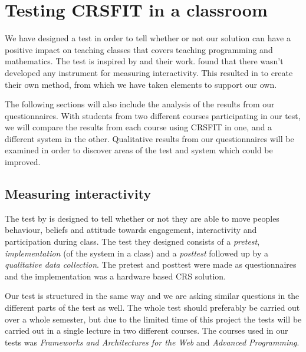 
\section{Testing CRSFIT in a classroom}\label{sec:testingcrs}
We have designed a test in order to tell whether or not our solution can have a positive impact on teaching classes that covers teaching programming and mathematics. The test is inspired by \cite{siau2006use} and their work.  found that there wasn't developed any instrument for measuring interactivity. This resulted in  to create their own method, from which we have taken elements to support our own.

The following sections will also include the analysis of the results from our questionnaires. With students from two different courses participating in our test, we will compare the results from each course using CRSFIT in one, and a different system in the other. Qualitative results from our questionnaires will be examined in order to discover areas of the test and system which could be improved.




\subsection{Measuring interactivity}
The test by  is designed to tell whether or not they are able to move peoples behaviour, beliefs and attitude towards engagement, interactivity and participation during class. The test they designed consists of a \emph{pretest}, \emph{implementation} (of the system in a class) and a \emph{posttest} followed up by a \emph{qualitative data collection}. The pretest and posttest were made as questionnaires and the implementation was a hardware based CRS solution.

Our test is structured in the same way and we are asking similar questions in the different parts of the test as well. The whole test should preferably be carried out over a whole semester, but due to the limited time of this project the tests will be carried out in a single lecture in two different courses. The courses used in our tests was \emph{Frameworks and Architectures for the Web} and \emph{Advanced Programming}.

